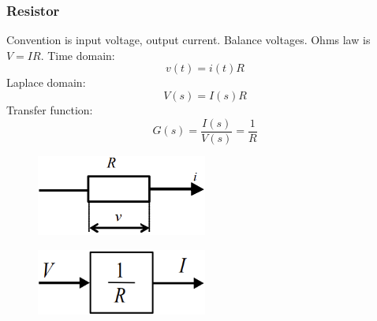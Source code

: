\documentclass[class=report, crop=false, 12pt,a4paper, tikz, border=4mm]{standalone}
\begin{document}
\subsubsection{Resistor}
Convention is input voltage, output current. Balance voltages.
Ohms law is $V=IR$. Time domain:
\begin{equation}
  v(t) = i(t)R
\end{equation}
Laplace domain:
\begin{equation}
  V(s) = I(s)R
\end{equation}
Transfer function:
\begin{equation}
  G(s) = \frac{I(s)}{V(s)} = \frac{1}{R}
\end{equation}
\begin{figure}[H]
  \centering
  \includegraphics[width = 0.5\textwidth]{../img/diagram5.png}
\end{figure}
\begin{figure}[H]
  \centering
  \includegraphics[width = 0.5\textwidth]{../img/blockdiagram16.png}
\end{figure}
\end{document}
